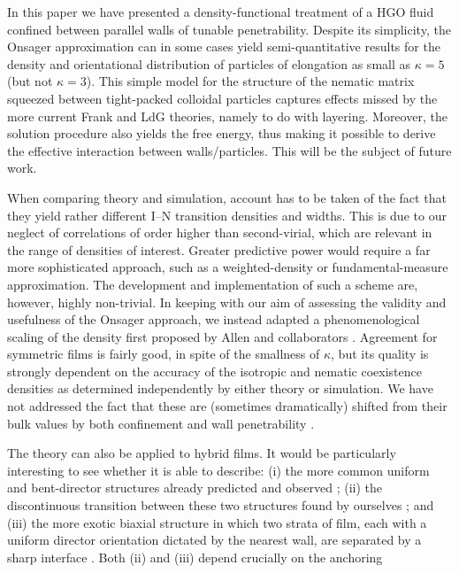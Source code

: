 \documentclass[aps,pre,twocolumn,groupedaddress,showpacs]{revtex4}
\begin{document}
In this paper we have presented a density-functional treatment of a HGO
fluid confined between parallel walls of tunable penetrability. 
Despite its simplicity, the Onsager approximation can in some cases yield
semi-quantitative results for the density and orientational distribution
of particles of elongation as small as $\kappa=5$ (but not $\kappa=3$).
This simple model for the structure of the nematic matrix squeezed
between tight-packed colloidal particles captures effects missed by the 
more current Frank and LdG theories, namely to do with layering. Moreover, 
the solution procedure also yields the free energy, thus making it possible 
to derive the effective interaction between walls/particles. This will 
be the subject of future work.
\par
When comparing theory and simulation, account
has to be taken of the fact that they yield rather different I--N 
transition densities and widths. This is due to our neglect of 
correlations of order higher than second-virial, which are relevant
in the range of densities of interest. Greater predictive power would 
require a far more sophisticated approach, such as a weighted-density 
\cite{Somoza:1989} or fundamental-measure \cite{Friederike:2002} 
approximation. The development 
and implementation of such a scheme are, however, highly non-trivial.
In keeping with our aim of assessing the validity and usefulness of 
the Onsager approach, we instead adapted a phenomenological scaling of the 
density first proposed by Allen and collaborators \cite{Friederike:2000}.
Agreement for symmetric films is fairly good, in spite of the smallness
of $\kappa$, but its quality is strongly dependent on the accuracy of 
the isotropic and nematic coexistence densities as determined independently 
by either theory or simulation. We have not addressed the fact that these 
are (sometimes dramatically) shifted from their bulk values by both 
confinement and wall penetrability \cite{Barmes:2003}.
\par
The theory can also be applied to hybrid films. It would be particularly 
interesting to see whether it is able to describe: (i) the more common 
uniform and bent-director structures already predicted \cite{Barbero:1983} 
and observed \cite{BlinovMazulla}; (ii) the discontinuous transition between
these two structures found by ourselves \cite{Cleaver:2001}; and (iii) the 
more exotic biaxial structure in which two strata of film, each with a uniform 
director orientation dictated by the nearest wall, are separated by a sharp 
interface \cite{Palffy}. Both (ii) and (iii) depend crucially on the anchoring
\end{document}
